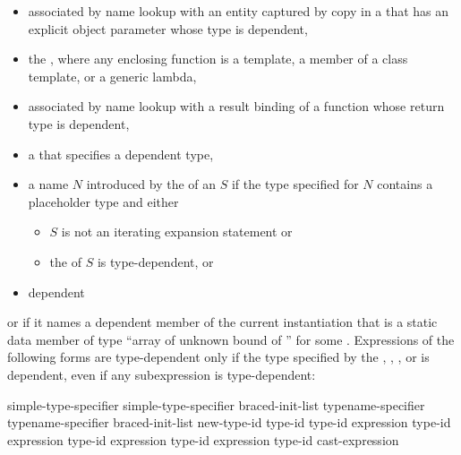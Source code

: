 \begin{itemize}
\begin{example}
\begin{codeblock}
int main() {
  f<int>();
}
\end{codeblock}
\end{example}
\item
associated by name lookup with
an entity captured by copy
in a 
that has an explicit object parameter whose type is dependent,
\item
the
, where any enclosing function is a
template, a member of a class template, or a generic lambda,
\item
associated by name lookup
with a result binding of a function
whose return type is dependent,
\item
a  that specifies a dependent type,
\item
a name $N$ introduced by the 
of an  $S$
if the type specified for $N$ contains a placeholder type and either
\begin{itemize}
\item $S$ is not an iterating expansion statement or
\item the  of $S$ is type-dependent, or
\end{itemize}
\item
dependent
\end{itemize}
or if it names a dependent member of the current instantiation that is a static
data member of type
``array of unknown bound of '' for some .
Expressions of the following forms are type-dependent only if the type
specified by the
,
,
,
or
is dependent, even if any subexpression is type-dependent:

\begin{ncsimplebnf}
simple-type-specifier \terminal{(}  \terminal{)}\br
simple-type-specifier braced-init-list\br
typename-specifier \terminal{(}  \terminal{)}\br
typename-specifier braced-init-list\br
\opt{\terminal{::}}   new-type-id \br
\opt{\terminal{::}}   \terminal{(} type-id \terminal{)} \br
{} \terminal{<} type-id \terminal{>} \terminal{(} expression \terminal{)}\br
{} \terminal{<} type-id \terminal{>} \terminal{(} expression \terminal{)}\br
{} \terminal{<} type-id \terminal{>} \terminal{(} expression \terminal{)}\br
{} \terminal{<} type-id \terminal{>} \terminal{(} expression \terminal{)}\br
\terminal{(} type-id \terminal{)} cast-expression
\end{ncsimplebnf}

